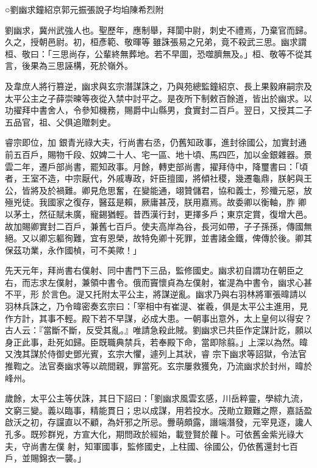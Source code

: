 
\begin{pinyinscope}

 ○劉幽求鐘紹京郭元振張說子均垍陳希烈附



 劉幽求，冀州武強人也。聖歷年，應制舉，拜閬中尉，刺史不禮焉，乃棄官而歸。久之，授朝邑尉。初，桓彥範、敬暉等
 雖誅張易之兄弟，竟不殺武三思。幽求謂桓、敬曰：「三思尚存，公輩終無葬地。若不早圖，恐噬臍無及。」桓、敬等不從其言，後果為三思誣構，死於嶺外。



 及韋庶人將行篡逆，幽求與玄宗潛謀誅之，乃與苑總監鐘紹京、長上果毅麻嗣宗及太平公主之子薛崇暕等夜從入禁中討平之。是夜所下制敕百餘道，皆出於幽求。以功擢拜中書舍人，令參知機務，賜爵中山縣男，食實封二百戶。翌日，又授其二子五品官，祖、父俱追贈刺史。



 睿宗即位，加
 銀青光祿大夫，行尚書右丞，仍舊知政事，進封徐國公，加實封通前五百戶，賜物千段、奴婢二十人、宅一區、地十頃、馬四匹，加以金銀雜器。景雲二年，遷戶部尚書，罷知政事。月餘，轉吏部尚書，擢拜侍中，降璽書曰：「頃者，王室不造，中宗厭代，外戚專政，奸臣擅國，將傾社稷，幾遷龜鼎，朕躬與王公，皆將及於禍難。卿見危思奮，在變能通，翊贊儲君，協和義士，殄殲元惡，放殛兇徒。我國家之復存，醫茲是賴，厥庸甚茂，朕用嘉焉。故委卿以衡軸，胙
 卿以茅土，然征賦未廣，寵錫猶輕。昔西漢行封，更擇多戶；東京定賞，復增大邑。故加賜卿實封二百戶，兼舊七百戶。使夫高岸為谷，長河如帶，子子孫孫，傳國無絕。又以卿忘軀徇難，宜有恩榮，故特免卿十死罪，並書諸金鐵，俾傳於後。卿其保茲功業，永作國楨，可不美歟！」



 先天元年，拜尚書右僕射、同中書門下三品，監修國史。幽求初自謂功在朝臣之右，而志求左僕射，兼領中書令。俄而竇懷貞為左僕射，崔湜為中書令，幽求心甚不平，形
 於言色。湜又托附太平公主，將謀逆亂。幽求乃與右羽林將軍張暐請以羽林兵誅之，乃令暐密奏玄宗曰：「宰相中有崔湜、崔羲，俱是太平公主進用，見作方計，其事不輕。殿下若不早謀，必成大患。一朝事出意外，太上皇何以得安？古人云：『當斷不斷，反受其亂。』唯請急殺此賊。劉幽求已共臣作定謀計訖，願以身正此事，赴死如歸。臣既職典禁兵，若奉殿下命，當即除翦。」上深以為然。暐又洩其謀於侍御史鄧光賓，玄宗大懼，遽列上其狀，睿
 宗下幽求等詔獄，令法官推鞫之。法官奏幽求等以疏間親，罪當死。玄宗屢救獲免，乃流幽求於封州，暐於峰州。



 歲餘，太平公主等伏誅，其日下詔曰：「劉幽求風雲玄感，川岳粹靈，學綜九流，文窮三變。義以臨事，精能貫日；忠以成謀，用若投水。茂勛立艱難之際，嘉話盈啟沃之初，存讜直以不顧，為奸邪之所忌。釁萌頗露，譖端潛發，元宰見逐，讒人孔多。既殄群兇，方宣大化，期問政於經始，載登賢於蘿卜。可依舊金紫光祿大夫，守尚書左僕
 射，知軍國事，監修國史，上柱國、徐國公，仍依舊還封七百戶，並賜錦衣一襲。」




\end{pinyinscope}
